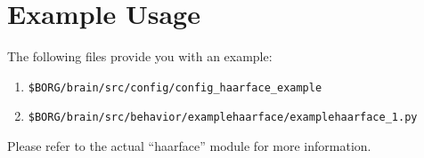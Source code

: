 \documentclass[a4paper, 10pt]{article}
\begin{document}
\section{Example Usage}

The following files provide you with an example:
\begin{enumerate}
    \item \lstinline{$BORG/brain/src/config/config_haarface_example}
    \item \lstinline{$BORG/brain/src/behavior/examplehaarface/examplehaarface_1.py}
\end{enumerate}

Please refer to the actual ``haarface'' module for more information.
\end{document}
